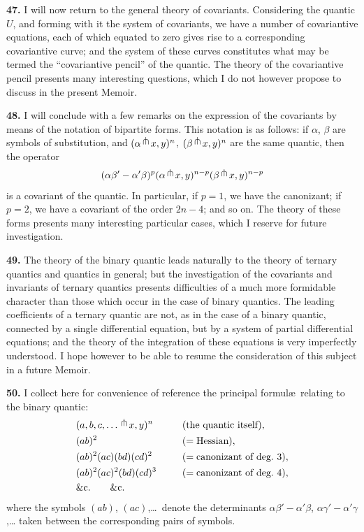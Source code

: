 \documentclass[11pt,a4paper]{article}
\begin{document}
\textbf{47.} I will now return to the general theory of covariants. Considering the quantic $U$, and forming with it the system of covariants, we have a number of covariantive equations, each of which equated to zero gives rise to a corresponding covariantive curve; and the system of these curves constitutes what may be termed the ``covariantive pencil'' of the quantic. The theory of the covariantive pencil presents many interesting questions, which I do not however propose to discuss in the present Memoir.

\textbf{48.} I will conclude with a few remarks on the expression of the covariants by means of the notation of bipartite forms. This notation is as follows: if $\alpha$, $\beta$ are symbols of substitution, and $(\alpha\,\raisebox{0.5ex}{$\pitchfork$}\, x,y)^{n}$, $(\beta\,\raisebox{0.5ex}{$\pitchfork$}\, x,y)^{n}$ are the same quantic, then the operator
\[
(\alpha\beta'-\alpha'\beta)^{p}(\alpha\,\raisebox{0.5ex}{$\pitchfork$}\, x,y)^{n-p}(\beta\,\raisebox{0.5ex}{$\pitchfork$}\, x,y)^{n-p}
\]
is a covariant of the quantic. In particular, if $p=1$, we have the canonizant; if $p=2$, we have a covariant of the order $2n-4$; and so on. The theory of these forms presents many interesting particular cases, which I reserve for future investigation.

\clearpage
\setcounter{page}{268}

\textbf{49.} The theory of the binary quantic leads naturally to the theory of ternary quantics and quantics in general; but the investigation of the covariants and invariants of ternary quantics presents difficulties of a much more formidable character than those which occur in the case of binary quantics. The leading coefficients of a ternary quantic are not, as in the case of a binary quantic, connected by a single differential equation, but by a system of partial differential equations; and the theory of the integration of these equations is very imperfectly understood. I hope however to be able to resume the consideration of this subject in a future Memoir.

\textbf{50.} I collect here for convenience of reference the principal formul\ae\ relating to the binary quantic:
\begin{alignat*}{2}
&(a,b,c,\ldots\,\raisebox{0.5ex}{$\pitchfork$}\, x,y)^{n}\qquad &&\text{(the quantic itself)},\\
&(ab)^{2}&&(=\text{Hessian}),\\
&(ab)^{2}(ac)(bd)(cd)^{2}&&(=\text{canonizant of deg.\ 3}),\\
&(ab)^{2}(ac)^{2}(bd)(cd)^{3}&&(=\text{canonizant of deg.\ 4}),\\
&\multicolumn{2}{l}{\&c.\qquad \&c.}
\end{alignat*}
where the symbols $(ab)$, $(ac)$,\ldots\ denote the determinants $\alpha\beta'-\alpha'\beta$, $\alpha\gamma'-\alpha'\gamma$,\ldots
taken between the corresponding pairs of symbols.
\end{document}
